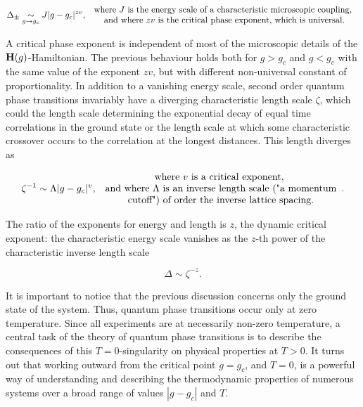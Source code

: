 \documentclass{homework}
\begin{document}
$$
    \Delta_{\pm} \underset{g \rightarrow g_c}{\sim} J |g-g_c|^{zv},  \begin{array}{c}
         \textnormal{ where $J$ is the energy scale of a characteristic microscopic coupling, }  \\
         \textnormal{ and where $zv$ is the critical phase exponent, which is universal.} 
    \end{array}
$$

A critical phase exponent is independent of most of the microscopic details of the ${\bf H}(g)$-Hamiltonian. The previous behaviour holds both for $g > g_c$ and $g < g_c$ with the same value of the exponent $zv$, but with different non-universal constant of proportionality. In addition to a vanishing energy scale, second order quantum phase transitions invariably have a diverging characteristic length scale $\zeta$, which could the length scale determining the exponential decay of equal time correlations in the ground state or the length scale at which some characteristic crossover occurs to the correlation at the longest distances. This length diverges as 

$$
\zeta^{-1} \sim \Lambda |g-g_c|^{v}, \begin{array}{c}
         \textnormal{ where $v$ is a critical exponent, }  \\
         \textnormal{ and where $\Lambda$ is an inverse length scale ("a momentum}\\\textnormal{ cutoff") of order the inverse lattice spacing.} 
    \end{array}.
$$

The ratio of the exponents for energy and length is $z$, the dynamic critical exponent: the characteristic energy scale vanishes as the $z$-th power of the characteristic inverse length scale 

$$
    \Delta \sim \zeta^{-z}.
$$

It is important to notice that the previous discussion concerns only the ground state of the system. Thus, quantum phase transitions occur only at zero temperature. Since all experiments are at necessarily non-zero temperature, a central task of the theory of quantum phase transitions is to describe the consequences of this $T=0$-singularity on physical properties at $T > 0$. It turns out that working outward from the critical point $g = g_c$, and $T=0$, is a powerful way of understanding and describing the thermodynamic properties of numerous systems over a broad range of values $|g-g_c|$ and $T$. \\
\end{document}

